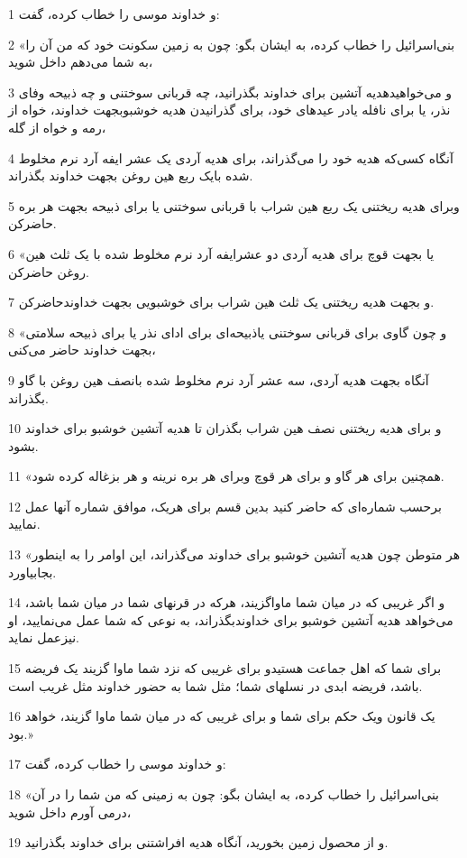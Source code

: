 \par 1 و خداوند موسی را خطاب کرده، گفت:
\par 2 «بنی‌اسرائیل را خطاب کرده، به ایشان بگو: چون به زمین سکونت خود که من آن را به شما می‌دهم داخل شوید،
\par 3 و می‌خواهیدهدیه آتشین برای خداوند بگذرانید، چه قربانی سوختنی و چه ذبیحه وفای نذر، یا برای نافله یادر عیدهای خود، برای گذرانیدن هدیه خوشبوبجهت خداوند، خواه از رمه و خواه از گله،
\par 4 آنگاه کسی‌که هدیه خود را می‌گذراند، برای هدیه آردی یک عشر ایفه آرد نرم مخلوط شده بایک ربع هین روغن بجهت خداوند بگذراند.
\par 5 وبرای هدیه ریختنی یک ربع هین شراب با قربانی سوختنی یا برای ذبیحه بجهت هر بره حاضرکن.
\par 6 «یا بجهت قوچ برای هدیه آردی دو عشرایفه آرد نرم مخلوط شده با یک ثلث هین روغن حاضرکن.
\par 7 و بجهت هدیه ریختنی یک ثلث هین شراب برای خوشبویی بجهت خداوندحاضرکن.
\par 8 «و چون گاوی برای قربانی سوختنی یاذبیحه‌ای برای ادای نذر یا برای ذبیحه سلامتی بجهت خداوند حاضر می‌کنی،
\par 9 آنگاه بجهت هدیه آردی، سه عشر آرد نرم مخلوط شده بانصف هین روغن با گاو بگذراند.
\par 10 و برای هدیه ریختنی نصف هین شراب بگذران تا هدیه آتشین خوشبو برای خداوند بشود.
\par 11 «همچنین برای هر گاو و برای هر قوچ وبرای هر بره نرینه و هر بزغاله کرده شود.
\par 12 برحسب شماره‌ای که حاضر کنید بدین قسم برای هریک، موافق شماره آنها عمل نمایید.
\par 13 «هر متوطن چون هدیه آتشین خوشبو برای خداوند می‌گذراند، این اوامر را به اینطور بجابیاورد.
\par 14 و اگر غریبی که در میان شما ماواگزیند، هرکه در قرنهای شما در میان شما باشد، می‌خواهد هدیه آتشین خوشبو برای خداوندبگذراند، به نوعی که شما عمل می‌نمایید، او نیزعمل نماید.
\par 15 برای شما که اهل جماعت هستیدو برای غریبی که نزد شما ماوا گزیند یک فریضه باشد، فریضه ابدی در نسلهای شما؛ مثل شما به حضور خداوند مثل غریب است.
\par 16 یک قانون ویک حکم برای شما و برای غریبی که در میان شما ماوا گزیند، خواهد بود.»
\par 17 و خداوند موسی را خطاب کرده، گفت:
\par 18 «بنی‌اسرائیل را خطاب کرده، به ایشان بگو: چون به زمینی که من شما را در آن درمی آورم داخل شوید،
\par 19 و از محصول زمین بخورید، آنگاه هدیه افراشتنی برای خداوند بگذرانید.
